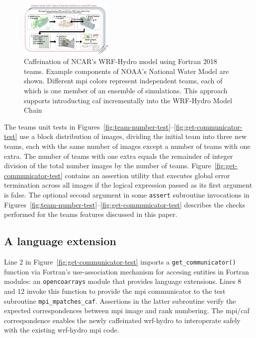 \begin{figure}
\includegraphics[width=0.4\textwidth]{figures/WRF-Hydro-caf-ens-model_chain.png}
\vspace{-7pt}
\caption{Caffeination of NCAR's WRF-Hydro model using Fortran 2018
  teams. Example components of  NOAA's National Water
  Model are shown. Different \gls{mpi} colors represent independent teams,
  each of which is one member of an ensemble of simulations.
  This approach supports introducting \gls{caf} incrementally
  into the WRF-Hydro Model Chain
  \label{fig:caffeinate-wrf-hydro}}
\end{figure}
%

The teams unit tests in
Figures~\ref{fig:team-number-test}--\ref{fig:get-communicator-test} use a block distribution of images,
dividing the initial team into three new teams, each with the same number of images except a number of teams
with one extra. The number of teams with one extra equals the remainder of integer division of the total
number images by the number of teams. Figure~\ref{fig:get-communicator-test} contains an assertion
utility that executes global error termination across all images if the logical expression passed as its
first argument is false.  The optional second argument in some
\texttt{assert} subroutine invocations in Figures~\ref{fig:team-number-test}--\ref{fig:get-communicator-test}
describes the checks performed for the teams features discussed in this paper.

\subsection{A language extension}
Line 2 in Figure~\ref{fig:get-communicator-test} imports a \texttt{get\_communicator()} function via Fortran's
use-association mechanism for accesing entities in Fortran modules: an \texttt{opencoarrays} module that
provides language extensions.  Lines 8 and 12 invoke this function
to provide the \gls{mpi} communicator to the test subroutine \texttt{mpi\_mpatches\_caf}.  Assertions in the
latter subroutine verify the expected correspondences between \gls{mpi} image and rank numbering.
The \gls{mpi}/\gls{caf} correspondence enables the newly caffeinated \gls{wrf-hydro}
to interoperate safely with the existing \gls{wrf-hydro} \gls{mpi} code.

